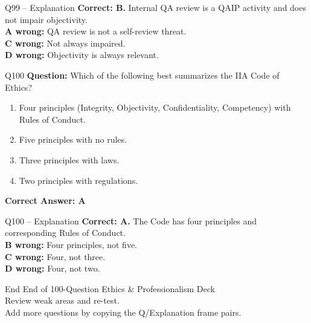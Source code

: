 \documentclass[aspectratio=169,10pt]{beamer}
\begin{document}
	\begin{frame}[t]{Q99 -- Explanation}
		\small
		\textbf{Correct: B.} Internal QA review is a QAIP activity and does not impair objectivity. \\[4pt]
		\textbf{A wrong:} QA review is not a self-review threat. \\[2pt]
		\textbf{C wrong:} Not always impaired. \\[2pt]
		\textbf{D wrong:} Objectivity is always relevant.
	\end{frame}
	
	\begin{frame}[t]{Q100}
		\small
		\textbf{Question:} Which of the following best summarizes the IIA Code of Ethics?
		\begin{enumerate}[label=\Alph*.,itemsep=1pt,topsep=2pt]
			\item Four principles (Integrity, Objectivity, Confidentiality, Competency) with Rules of Conduct.
			\item Five principles with no rules.
			\item Three principles with laws.
			\item Two principles with regulations.
		\end{enumerate}
		\vspace{4pt}
		\textbf{Correct Answer: A}
	\end{frame}
	
	\begin{frame}[t]{Q100 -- Explanation}
		\small
		\textbf{Correct: A.} The Code has four principles and corresponding Rules of Conduct. \\[4pt]
		\textbf{B wrong:} Four principles, not five. \\[2pt]
		\textbf{C wrong:} Four, not three. \\[2pt]
		\textbf{D wrong:} Four, not two.
	\end{frame}
	
	\begin{frame}{End}
		\centering
		\Large End of 100-Question Ethics \& Professionalism Deck\\[8pt]
		\normalsize Review weak areas and re-test.\\[4pt]
		\small Add more questions by copying the Q/Explanation frame pairs.
	\end{frame}
	
\end{document}
